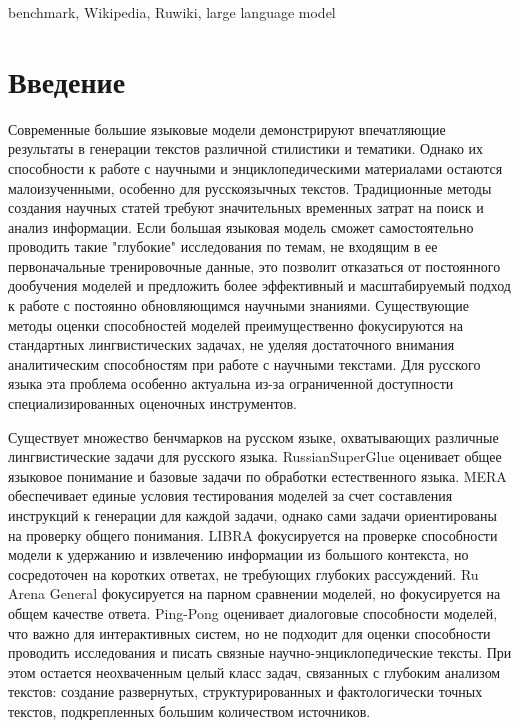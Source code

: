 \documentclass{article}
\theoremstyle{definition}
\theoremstyle{plain}
\begin{document}
\begin{altkeywords}
benchmark, Wikipedia, Ruwiki, large language model
\end{altkeywords}

\section*{Введение}

Современные большие языковые модели демонстрируют впечатляющие результаты в генерации текстов различной стилистики и тематики. 
Однако их способности к работе с научными и энциклопедическими материалами остаются малоизученными, особенно для русскоязычных текстов. 
Традиционные методы создания научных статей требуют значительных временных затрат на поиск и анализ информации. 
Если большая языковая модель сможет самостоятельно проводить такие "глубокие" исследования по темам, не входящим в ее первоначальные тренировочные данные, это позволит отказаться от постоянного дообучения моделей
и предложить более эффективный и масштабируемый подход к работе с постоянно обновляющимся научными знаниями.
Существующие методы оценки способностей моделей преимущественно фокусируются на стандартных лингвистических задачах, не уделяя достаточного внимания аналитическим способностям при работе с научными текстами.
Для русского языка эта проблема особенно актуальна из-за ограниченной доступности специализированных оценочных инструментов.

Существует множество бенчмарков на русском языке, охватывающих различные лингвистические задачи для русского языка.
RussianSuperGlue \cite{rsglue} оценивает общее языковое понимание и базовые задачи по обработки естественного языка. 
MERA \cite{mera} обеспечивает единые условия тестирования моделей за счет составления инструкций к генерации для каждой задачи, однако сами задачи ориентированы на проверку общего понимания. 
LIBRA \cite{libra} фокусируется на проверке способности модели к удержанию и извлечению информации из большого контекста, но сосредоточен на коротких ответах, не требующих глубоких рассуждений. 
Ru Arena General \cite{arena} фокусируется на парном сравнении моделей, но фокусируется на общем качестве ответа.
Ping-Pong \cite{pp} оценивает диалоговые способности моделей, что важно для интерактивных систем, но не подходит для оценки способности проводить исследования и писать связные научно-энциклопедические тексты.
При этом остается неохваченным целый класс задач, связанных с глубоким анализом текстов: создание развернутых, структурированных и фактологически точных текстов, подкрепленных большим количеством источников. 
\end{document}

